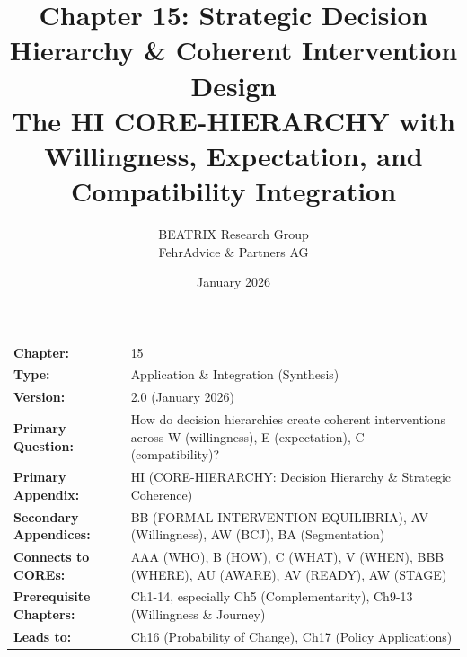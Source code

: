 \documentclass[11pt, a4paper]{article}
\title{Chapter 15: Strategic Decision Hierarchy \& Coherent Intervention Design\\
The HI CORE-HIERARCHY with Willingness, Expectation, and Compatibility Integration}
\author{BEATRIX Research Group \\ FehrAdvice \& Partners AG}
\date{January 2026}
\begin{document}
\maketitle


\begin{tcolorbox}[colback=gray!10!white, colframe=gray!75!black, title=Chapter Metadata]
\begin{tabular}{@{}ll@{}}
\textbf{Chapter:} & 15 \\
\textbf{Type:} & Application \& Integration (Synthesis) \\
\textbf{Version:} & 2.0 (January 2026) \\
\textbf{Primary Question:} & How do decision hierarchies create coherent interventions across W (willingness), E (expectation), C (compatibility)? \\
\textbf{Primary Appendix:} & HI (CORE-HIERARCHY: Decision Hierarchy \& Strategic Coherence) \\
\textbf{Secondary Appendices:} & BB (FORMAL-INTERVENTION-EQUILIBRIA), AV (Willingness), AW (BCJ), BA (Segmentation) \\
\textbf{Connects to COREs:} & AAA (WHO), B (HOW), C (WHAT), V (WHEN), BBB (WHERE), AU (AWARE), AV (READY), AW (STAGE) \\
\textbf{Prerequisite Chapters:} & Ch1-14, especially Ch5 (Complementarity), Ch9-13 (Willingness \& Journey) \\
\textbf{Leads to:} & Ch16 (Probability of Change), Ch17 (Policy Applications) \\
\end{tabular}
\end{tcolorbox}

\end{document}

